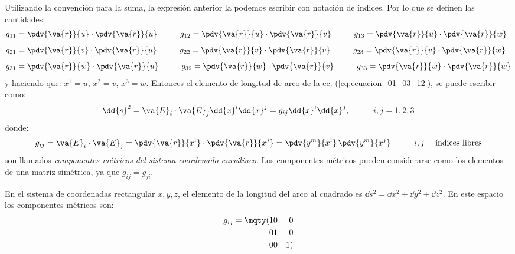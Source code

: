 Utilizando la convención para la suma, la expresión anterior la podemos escribir con notación de índices. Por lo que se definen las cantidades:
\begin{align*}
g_{11} &= \pdv{\va{r}}{u} \cdot \pdv{\va{r}}{u} \hspace{1cm} g_{12} = \pdv{\va{r}}{u} \cdot \pdv{\va{r}}{v} \hspace{1cm} g_{13} = \pdv{\va{r}}{u} \cdot \pdv{\va{r}}{w} \\[0.5em]
g_{21} &= \pdv{\va{r}}{v} \cdot \pdv{\va{r}}{u} \hspace{1cm} g_{22} = \pdv{\va{r}}{v} \cdot \pdv{\va{r}}{v} \hspace{1cm} g_{23} = \pdv{\va{r}}{v} \cdot \pdv{\va{r}}{w} \\[0.5em]
g_{31} &= \pdv{\va{r}}{w} \cdot \pdv{\va{r}}{u} \hspace{1cm} g_{32} = \pdv{\va{r}}{w} \cdot \pdv{\va{r}}{v} \hspace{1cm} g_{33} = \pdv{\va{r}}{w} \cdot \pdv{\va{r}}{w}
\end{align*}
y haciendo que: $x^{1} = u$, $x^{2} = v$, $x^{3} = w$. Entonces el elemento de longitud de arco de la ec. (\ref{eq:ecuacion_01_03_12}), se puede escribir como:
\begin{align*}
\dd{s}^{2} = \va{E}_{i} \cdot \va{E}_{j} \dd{x}^{i} \dd{x}^{j} = g_{ij} \dd{x}^{i} \dd{x}^{j}, \hspace{1cm} i, j = 1, 2, 3
\end{align*}
donde:
\begin{align}
g_{ij} = \va{E}_{i} \cdot \va{E}_{j} = \pdv{\va{r}}{x^{i}} \cdot \pdv{\va{r}}{x^{j}} = \pdv{y^{m}}{x^{i}} \, \pdv{y^{m}}{x^{j}} \hspace{1cm} i, j \quad \mbox{ índices libres}
\label{eq:ecuacion_01_03_13}
\end{align}
son llamados \emph{componentes métricos del sistema coordenado curvilíneo}. Los componentes métricos pueden considerarse como los elementos de una matriz simétrica, ya que $g_{ij} = g_{ji}$.
\par
En el sistema de coordenadas rectangular $x, y, z$, el elemento de la longitud del arco al cuadrado es $\dd{s}^{2} = \dd{x}^{2} + \dd{y}^{2} + \dd{z}^{2}$. En este espacio los componentes métricos son:
\begin{align*}
g_{ij} = \mqty(
1 & 0 & 0 \\
0 & 1 & 0 \\
0 & 0 & 1 )
\end{align*}
\\
